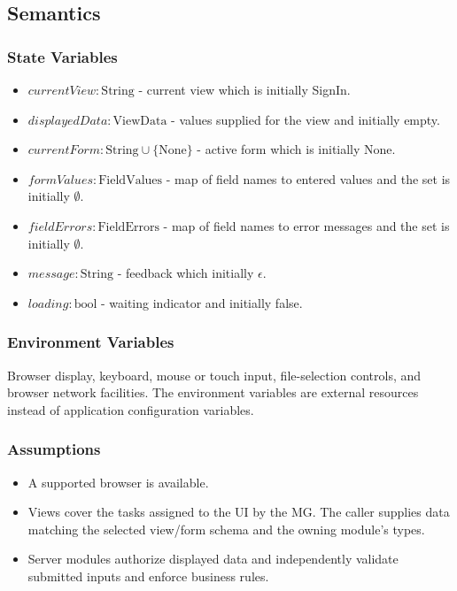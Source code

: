\documentclass[12pt, titlepage]{article}
\begin{document}
\subsection{Semantics}

\subsubsection{State Variables}
\begin{itemize}
  \item $\mathit{currentView}:\text{String}$ - current view which is initially SignIn.
  \item $\mathit{displayedData}:\text{ViewData}$ - values supplied for the view and initially empty.
  \item $\mathit{currentForm}:\text{String}\cup\{\text{None}\}$ - active form which is initially None.
  \item $\mathit{formValues}:\text{FieldValues}$ - map of field names to entered values and the set is initially $\emptyset$.
  \item $\mathit{fieldErrors}:\text{FieldErrors}$ - map of field names to error messages and the set is initially $\emptyset$.
  \item $\mathit{message}:\text{String}$ - feedback which initially $\epsilon$.
  \item $\mathit{loading}:\text{bool}$ - waiting indicator and initially false.
\end{itemize}

\subsubsection{Environment Variables}
Browser display, keyboard, mouse or touch input, file-selection controls, and browser network facilities. The environment variables are external resources instead of application configuration variables.

\subsubsection{Assumptions}
\begin{itemize}
  \item A supported browser is available.
  \item Views cover the tasks assigned to the UI by the MG. The caller supplies data matching the selected view/form schema and the owning module's types.
  \item Server modules authorize displayed data and independently validate submitted inputs and enforce business rules.
\end{itemize}
\end{document}
